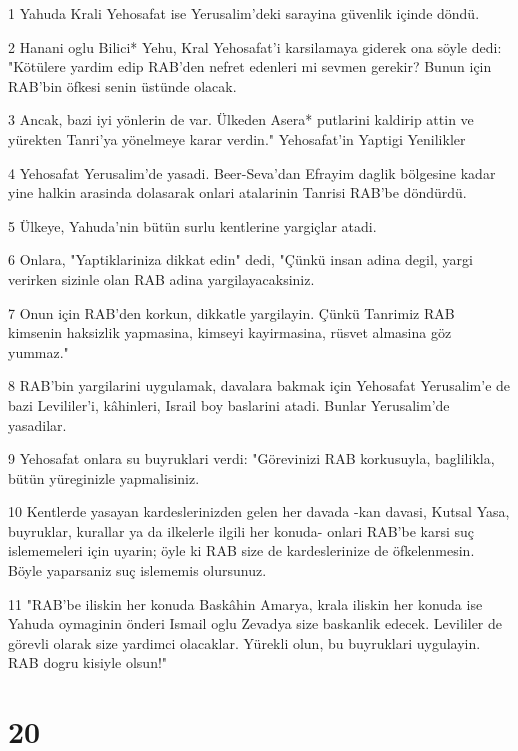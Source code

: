 \par 1 Yahuda Krali Yehosafat ise Yerusalim'deki sarayina güvenlik içinde döndü.
\par 2 Hanani oglu Bilici* Yehu, Kral Yehosafat'i karsilamaya giderek ona söyle dedi: "Kötülere yardim edip RAB'den nefret edenleri mi sevmen gerekir? Bunun için RAB'bin öfkesi senin üstünde olacak.
\par 3 Ancak, bazi iyi yönlerin de var. Ülkeden Asera* putlarini kaldirip attin ve yürekten Tanri'ya yönelmeye karar verdin." Yehosafat'in Yaptigi Yenilikler
\par 4 Yehosafat Yerusalim'de yasadi. Beer-Seva'dan Efrayim daglik bölgesine kadar yine halkin arasinda dolasarak onlari atalarinin Tanrisi RAB'be döndürdü.
\par 5 Ülkeye, Yahuda'nin bütün surlu kentlerine yargiçlar atadi.
\par 6 Onlara, "Yaptiklariniza dikkat edin" dedi, "Çünkü insan adina degil, yargi verirken sizinle olan RAB adina yargilayacaksiniz.
\par 7 Onun için RAB'den korkun, dikkatle yargilayin. Çünkü Tanrimiz RAB kimsenin haksizlik yapmasina, kimseyi kayirmasina, rüsvet almasina göz yummaz."
\par 8 RAB'bin yargilarini uygulamak, davalara bakmak için Yehosafat Yerusalim'e de bazi Levililer'i, kâhinleri, Israil boy baslarini atadi. Bunlar Yerusalim'de yasadilar.
\par 9 Yehosafat onlara su buyruklari verdi: "Görevinizi RAB korkusuyla, baglilikla, bütün yüreginizle yapmalisiniz.
\par 10 Kentlerde yasayan kardeslerinizden gelen her davada -kan davasi, Kutsal Yasa, buyruklar, kurallar ya da ilkelerle ilgili her konuda- onlari RAB'be karsi suç islememeleri için uyarin; öyle ki RAB size de kardeslerinize de öfkelenmesin. Böyle yaparsaniz suç islememis olursunuz.
\par 11 "RAB'be iliskin her konuda Baskâhin Amarya, krala iliskin her konuda ise Yahuda oymaginin önderi Ismail oglu Zevadya size baskanlik edecek. Levililer de görevli olarak size yardimci olacaklar. Yürekli olun, bu buyruklari uygulayin. RAB dogru kisiyle olsun!"

\chapter{20}

